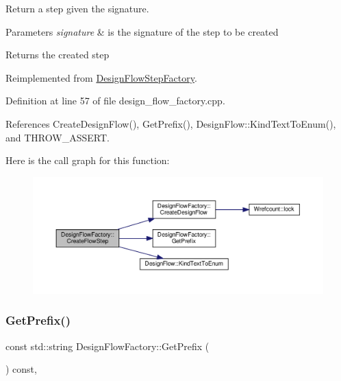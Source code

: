 Return a step given the signature. 


\begin{DoxyParams}{Parameters}
{\em signature} & is the signature of the step to be created \\
\hline
\end{DoxyParams}
\begin{DoxyReturn}{Returns}
the created step 
\end{DoxyReturn}


Reimplemented from \hyperlink{classDesignFlowStepFactory_af65c5bc8971c3ae43e0f4b6fa183c1af}{Design\+Flow\+Step\+Factory}.



Definition at line 57 of file design\+\_\+flow\+\_\+factory.\+cpp.



References Create\+Design\+Flow(), Get\+Prefix(), Design\+Flow\+::\+Kind\+Text\+To\+Enum(), and T\+H\+R\+O\+W\+\_\+\+A\+S\+S\+E\+RT.

Here is the call graph for this function\+:
\nopagebreak
\begin{figure}[H]
\begin{center}
\leavevmode
\includegraphics[width=350pt]{d7/d9e/classDesignFlowFactory_a4dd446831a1e7d6f5af137beff1d4cab_cgraph}
\end{center}
\end{figure}
\mbox{\label{classDesignFlowFactory_a926debf95513064610a97e5240f5c530}} 
\subsubsection{\texorpdfstring{Get\+Prefix()}{GetPrefix()}}
{\footnotesize\ttfamily const std\+::string Design\+Flow\+Factory\+::\+Get\+Prefix (\begin{DoxyParamCaption}{ }\end{DoxyParamCaption}) const\hspace{0.3cm}{\ttfamily [override]}, {\ttfamily [virtual]}}




